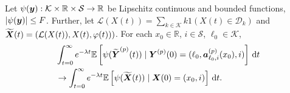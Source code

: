 \begin{cor}\label{cor: lk}
	Let \(\psi(\boldsymbol y):\mathcal K \times \mathbb R\times \mathcal S \to \mathbb R\) be Lipschitz continuous and bounded functions, \(|\psi(\boldsymbol y)|\leq F\). Further, let \(\mathcal L(X(t)) = \sum_{k\in\mathcal K}k1(X(t)\in\mathcal D_k)\) and \(\widetilde{\boldsymbol X}(t) = (\mathcal L(X(t)),X(t),\varphi(t)))\). For each \(x_0\in\mathbb R\), \(i\in\mathcal S\), \(\ell_0\in\mathcal K\), 
	\begin{align}
		&\int_{t=0}^\infty e^{-\lambda t}\mathbb E\left[\psi(\widetilde{\boldsymbol Y}^{(p)}(t))  \mid \boldsymbol Y^{(p)}(0)=(\ell_0, \boldsymbol  a_{\ell_0,i}^{(p)}(x_0),i) \right] \, \mathrm{d} t \nonumber
		\\&\to \int_{t=0}^\infty e^{-\lambda t}  \mathbb E\left[\psi(\widetilde{\boldsymbol X}(t))\mid \boldsymbol X(0)=(x_0, i) \right] \, \mathrm{d} t.\nonumber
	\end{align}
\end{cor}
